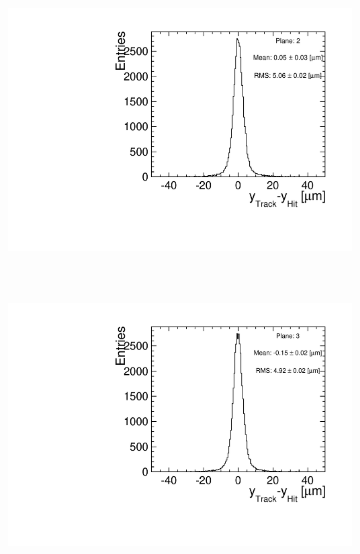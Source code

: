 \begin{figure}[htbp]
\begin{subfigure}[b]{0.3\textwidth}
    \includegraphics[width=\textwidth]{figures/Telescope/biasedResiduals/BiasedResiduals_run661_PlaneYRMS2.pdf}
    \caption{}
  \end{subfigure} \\
  \begin{subfigure}[b]{0.3\textwidth}
    \includegraphics[width=\textwidth]{figures/Telescope/biasedResiduals/BiasedResiduals_run661_PlaneYRMS3.pdf}
    \caption{}
  \end{subfigure}\hfill
  \begin{subfigure}[b]{0.3\textwidth}

\end{subfigure}
\end{figure}
